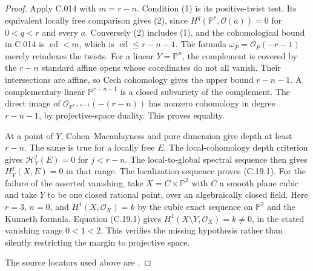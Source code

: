 \begin{proof}
Apply C.014 with $m=r-n$. Condition (1) is its positive-twist test.
Its equivalent locally free comparison gives (2), since
$H^q(\mathbb P^r,\mathcal O(a))=0$ for $0<q<r$ and every $a$.
Conversely (2) includes (1), and the cohomological bound in C.014 is
$\operatorname{cd}<m$, which is $\operatorname{cd}\leq r-n-1$.
The formula $\omega_P=\mathcal O_P(-r-1)$ merely reindexes the twists.
For a linear $Y=\mathbb P^n$, the complement is covered by the
$r-n$ standard affine opens whose coordinates do not all vanish.
Their intersections are affine, so Cech cohomology gives the upper
bound $r-n-1$. A complementary linear $\mathbb P^{r-n-1}$ is a
closed subvariety of the complement. The direct image of
$\mathcal O_{\mathbb P^{r-n-1}}(-(r-n))$ has nonzero cohomology in
degree $r-n-1$, by projective-space duality. This proves equality.

At a point of $Y$, Cohen--Macaulayness and pure dimension give
depth at least $r-n$. The same is true for a locally free $E$.
The local-cohomology depth criterion gives
$\mathcal H^j_Y(E)=0$ for $j<r-n$. The local-to-global spectral
sequence then gives $H^j_Y(X,E)=0$ in that range. The localization
sequence proves (C.19.1).
For the failure of the asserted vanishing, take
$X=C\times\mathbb P^2$ with $C$ a smooth plane cubic and take
$Y$ to be one closed rational point, over an algebraically closed
field. Here $r=3$, $n=0$, and
$H^1(X,\mathcal O_X)=k$ by the cubic exact sequence on
$\mathbb P^2$ and the Kunneth formula. Equation (C.19.1) gives
$H^1(X\setminus Y,\mathcal O_X)=k\ne0$, in the stated vanishing
range $0<1<2$. This verifies the missing hypothesis rather than
silently restricting the margin to projective space.

The source locators used above are \cite[scans 003 and 008]{C-ms125}.
\end{proof}

